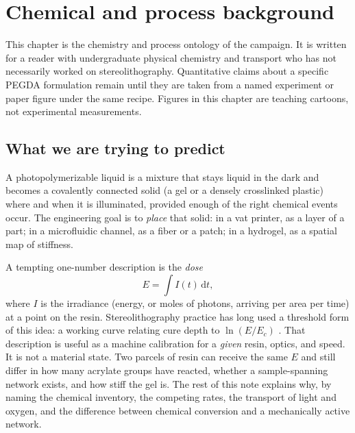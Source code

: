 \chapter{Chemical and process background}
\label{ch:background}

This chapter is the chemistry and process ontology of the campaign.
It is written for a reader with undergraduate physical chemistry and transport who has not necessarily worked on stereolithography.
Quantitative claims about a specific PEGDA formulation remain \stillreq{} until they are taken from a named experiment or paper figure under the same recipe.
Figures in this chapter are teaching cartoons, not experimental measurements.

\section{What we are trying to predict}

A photopolymerizable liquid is a mixture that stays liquid in the dark and becomes a covalently connected solid (a gel or a densely crosslinked plastic) where and when it is illuminated, provided enough of the right chemical events occur.
The engineering goal is to \emph{place} that solid: in a vat printer, as a layer of a part; in a microfluidic channel, as a fiber or a patch; in a hydrogel, as a spatial map of stiffness.

A tempting one-number description is the \emph{dose}
\begin{equation}
  E = \int I(t)\,\mathrm{d}t,
  \label{eq:dose}
\end{equation}
where $I$ is the irradiance (energy, or moles of photons, arriving per area per time) at a point on the resin.
Stereolithography practice has long used a threshold form of this idea: a working curve relating cure depth to $\ln(E/E_c)$ \citep{Jacobs1992book}.
That description is useful as a machine calibration for a \emph{given} resin, optics, and speed.
It is not a material state.
Two parcels of resin can receive the same $E$ and still differ in how many acrylate groups have reacted, whether a sample-spanning network exists, and how stiff the gel is.
The rest of this note explains why, by naming the chemical inventory, the competing rates, the transport of light and oxygen, and the difference between chemical conversion and a mechanically active network.

